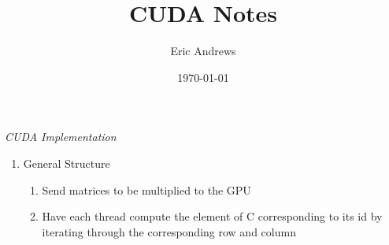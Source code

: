 \documentclass[12pt]{article}
\begin{document}
\title{CUDA Notes}
\author{Eric Andrews}
\date{\today}
\pagestyle{fancy}

\maketitle

\centerline{\textit{CUDA Implementation}}

\begin{enumerate}[label=-]
\item General Structure
  \begin{enumerate}[label=-]
  \item Send matrices to be multiplied to the GPU
  \item Have each thread compute the element of C corresponding to its id by iterating through the corresponding row and column
  \end{enumerate}
\end{enumerate}
\end{document}
